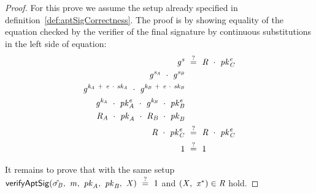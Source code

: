 \begin{proof}
    \label{prf:aptSchnorrPreSigCorr}
    For this prove we assume the setup already specified in definition~\ref{def:aptSigCorrectness}.
    The proof is by showing equality of the equation checked by the verifier of the final signature by continuous substitutions in the left side of equation:
    \begin{align}
        \mathit{g}^{\mathit{s}} &~\stackrel{?}{=}~ \mathit{R} ~\cdot~ \mathit{pk}_{\mathit{C}}^{\mathit{e}} \\
        \mathit{g}^{\mathit{s}_{\mathit{A}}} ~\cdot~ \mathit{g}^{\mathit{s}_{\mathit{B}}} & \\
        \mathit{g}^{\mathit{\mathit{k}_{\mathit{A}}} ~+~ \mathit{e} ~\cdot~ \mathit{sk}_{\mathit{A}}} ~\cdot~ \mathit{g}^{\mathit{\mathit{k}_{\mathit{B}}} ~+~ \mathit{e} ~\cdot~ \mathit{sk}_{\mathit{B}}} & \\
        \mathit{g}^{\mathit{\mathit{k}_{\mathit{A}}}} ~\cdot~ \mathit{pk}_{\mathit{A}}^{\mathit{e}} ~\cdot~ \mathit{g}^{\mathit{\mathit{k}_{\mathit{B}}}} ~\cdot~ \mathit{pk}_{\mathit{B}}^{\mathit{e}} & \\
        \mathit{R}_{\mathit{A}} ~\cdot~ \mathit{pk}_{\mathit{A}} ~\cdot~ \mathit{R}_{\mathit{B}} ~\cdot~ \mathit{pk}_{\mathit{B}} & \\
        \mathit{R} ~\cdot~ \mathit{pk}_{\mathit{C}}^{\mathit{e}} & ~\stackrel{?}{=}~ \mathit{R} ~\cdot~ \mathit{pk}_{\mathit{C}}^{\mathit{e}} \\
        1 & ~\stackrel{?}{=}~ 1
    \end{align}

    It remains to prove that with the same setup $\mathsf{verifyAptSig}(\hat{\sigma_{\mathit{B}}} ,~ \mathit{m} ,~ \mathit{pk}_{\mathit{A}} ,~ \mathit{pk}_{\mathit{B}} ,~ \mathit{X}) ~\stackrel{?}{=}~ 1$ and
    $(\mathit{X} ,~ \mathit{x}^*) \in \mathit{R}$ hold.


\end{proof}
